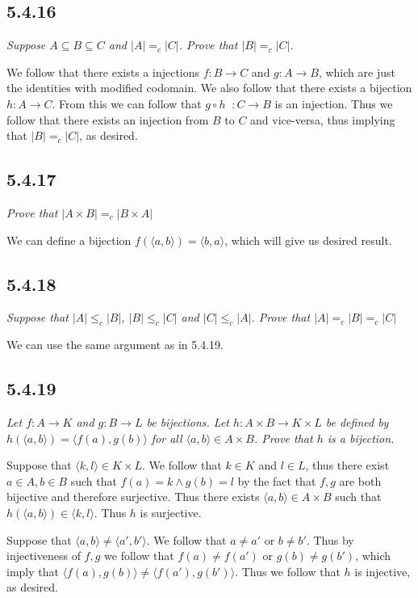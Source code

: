 \documentclass[11pt,oneside,titlepage]{book}
\DeclareMathOperator \inv {^{-1}}
\newcommand{\eangle}[1]{\langle #1 \rangle}
\begin{document}
\subsection*{5.4.16}

\textit{Suppose $A \subseteq B \subseteq C$ and $|A| =_c |C|$. Prove that $|B| =_c |C|$.}

We follow that there exists a injections $f: B \to C$ and $g: A \to B$, which are
just the identities with modified codomain. We also follow that
there exists a bijection $h: A \to C$. From this we can follow that 
$g \circ h\inv: C \to B$ is an injection. Thus we follow that there exists an injection
from $B$ to $C$ and vice-versa, thus implying that $|B| =_c |C|$, as desired.

\subsection*{5.4.17}

\textit{Prove that $|A \times B| =_c |B \times A|$}

We can define a bijection $f(\eangle{a, b}) = \eangle{b, a}$, which will give us desired result.

\subsection*{5.4.18}

\textit{Suppose that $|A| \leq_c |B|$, $|B| \leq_c |C|$ and $|C| \leq_c |A|$. Prove
  that $|A| =_c |B| =_c |C|$}

We can use the same argument as in 5.4.19.

\subsection*{5.4.19}

\textit{Let $f: A \to K$ and $g: B \to L$ be bijections. Let $h: A \times B \to K \times L$
  be defined by $h(\eangle{a, b}) = \eangle{f(a), g(b)}$ for all $\eangle{a, b} \in A \times B$.
  Prove that $h$ is a bijection.}

Suppose that $\eangle{k, l} \in K \times L$. We follow that $k \in K$ and $l \in L$, thus
there exist $a \in A, b \in B$ such that $f(a) = k \land g(b) = l$ by the fact
that $f, g$ are both bijective and therefore surjective. Thus there exists
$\eangle{a, b} \in A \times B$ such that $h(\eangle{a, b}) \in \eangle{k, l}$. Thus $h$
is surjective.

Suppose that $\eangle{a, b} \neq \eangle{a', b'}$. We follow that $a \neq a'$ or $b \neq b'$.
Thus by injectiveness of $f, g$ we follow that $f(a) \neq f(a')$ or $g(b) \neq g(b')$, which imply
that $\eangle{f(a), g(b)} \neq \eangle{f(a'), g(b')}$. Thus we follow that $h$ is injective,
as desired.
\end{document}
